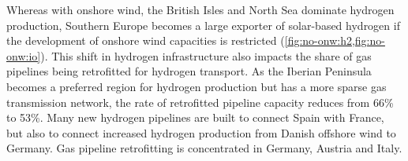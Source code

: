 
Whereas with onshore wind, the  British Isles and North Sea dominate hydrogen
production, Southern Europe becomes a large exporter of solar-based hydrogen if
the development of onshore wind capacities is restricted
(\cref{fig:no-onw:h2,fig:no-onw:io}). This shift in hydrogen
infrastructure also impacts the share of gas pipelines being retrofitted for
hydrogen transport. As the Iberian Peninsula becomes a preferred region for
hydrogen production but has a more sparse gas transmission network, the rate of
retrofitted pipeline capacity reduces from 66\% to 53\%. Many new hydrogen
pipelines are built to connect Spain with France, but also to connect increased
hydrogen production from Danish offshore wind to Germany. Gas pipeline
retrofitting is concentrated in Germany, Austria and Italy.
